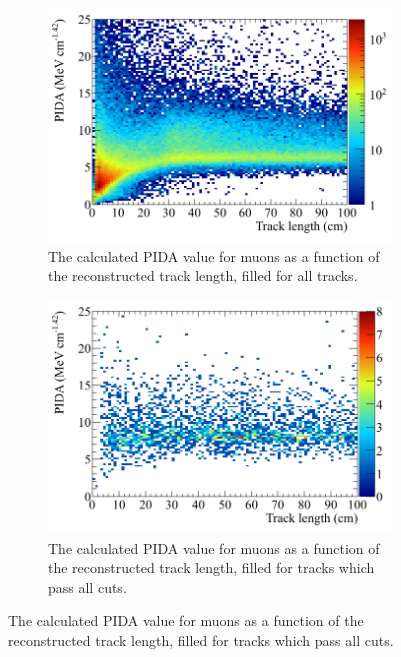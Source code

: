 \begin{figure}
  \centering
  \begin{subfigure}{0.48\textwidth}
        \centering
        \includegraphics[width=\textwidth]{ProtonEnrich_500V_v05_14_00_trackpmtrackdc_Muon_All_PIDA_TrackLen}
        \caption{The calculated PIDA value for muons as a function of the reconstructed track length, filled for all tracks.}
        \label{fig:CRY_PIDATrLen_Muon_All}
  \end{subfigure}%
  \hspace{0.03\textwidth}%
  \begin{subfigure}{0.48\textwidth}
        \centering
        \includegraphics[width=\textwidth]{ProtonEnrich_500V_v05_14_00_trackpmtrackdc_Muon_End_PIDA_TrackLen}
        \caption{The calculated PIDA value for muons as a function of the reconstructed track length, filled for tracks which pass all cuts.}

\end{subfigure}
\end{figure}
